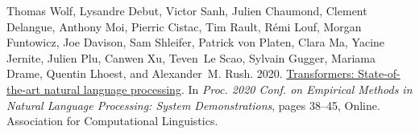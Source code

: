 \documentclass[11pt,a4paper]{article}
\begin{document}
\begin{thebibliography}{26}
  Thomas Wolf, Lysandre Debut, Victor Sanh, Julien Chaumond, Clement Delangue,
    Anthony Moi, Pierric Cistac, Tim Rault, Rémi Louf, Morgan Funtowicz, Joe
    Davison, Sam Shleifer, Patrick von Platen, Clara Ma, Yacine Jernite, Julien
    Plu, Canwen Xu, Teven~Le Scao, Sylvain Gugger, Mariama Drame, Quentin Lhoest,
    and Alexander~M. Rush. 2020.
  \newblock \href {https://www.aclweb.org/anthology/2020.emnlp-demos.6}
    {Transformers: State-of-the-art natural language processing}.
  \newblock In \emph{Proc. 2020 Conf. on Empirical Methods in Natural Language
    Processing: System Demonstrations}, pages 38--45, Online. Association for
    Computational Linguistics.
  
  \end{thebibliography}
  

\appendix
\end{document}
